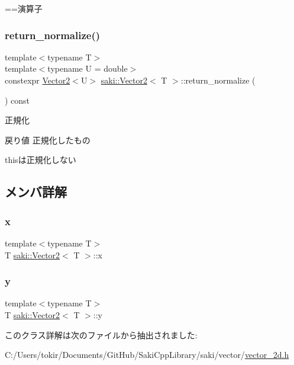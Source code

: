 ==演算子 

\mbox{\label{classsaki_1_1_vector2_ad4fe2f7cb118bfad82333017c15c591a}} 
\subsubsection{\texorpdfstring{return\+\_\+normalize()}{return\_normalize()}}
{\footnotesize\ttfamily template$<$typename T$>$ \\
template$<$typename U  = double$>$ \\
constexpr \mbox{\hyperlink{classsaki_1_1_vector2}{Vector2}}$<$U$>$ \mbox{\hyperlink{classsaki_1_1_vector2}{saki\+::\+Vector2}}$<$ T $>$\+::return\+\_\+normalize (\begin{DoxyParamCaption}{ }\end{DoxyParamCaption}) const\hspace{0.3cm}{\ttfamily [inline]}}



正規化 

\begin{DoxyReturn}{戻り値}
正規化したもの
\end{DoxyReturn}
thisは正規化しない 

\subsection{メンバ詳解}
\mbox{\label{classsaki_1_1_vector2_a69df7df6da198f35ef8ed269eb095c27}} 
\subsubsection{\texorpdfstring{x}{x}}
{\footnotesize\ttfamily template$<$typename T$>$ \\
T \mbox{\hyperlink{classsaki_1_1_vector2}{saki\+::\+Vector2}}$<$ T $>$\+::x}

\mbox{\label{classsaki_1_1_vector2_a54e83290254fb653eff9b8dcf6a10878}} 
\subsubsection{\texorpdfstring{y}{y}}
{\footnotesize\ttfamily template$<$typename T$>$ \\
T \mbox{\hyperlink{classsaki_1_1_vector2}{saki\+::\+Vector2}}$<$ T $>$\+::y}



このクラス詳解は次のファイルから抽出されました\+:\begin{DoxyCompactItemize}
\item 
C\+:/\+Users/tokir/\+Documents/\+Git\+Hub/\+Saki\+Cpp\+Library/saki/vector/\mbox{\hyperlink{vector__2d_8h}{vector\+\_\+2d.\+h}}\end{DoxyCompactItemize}
